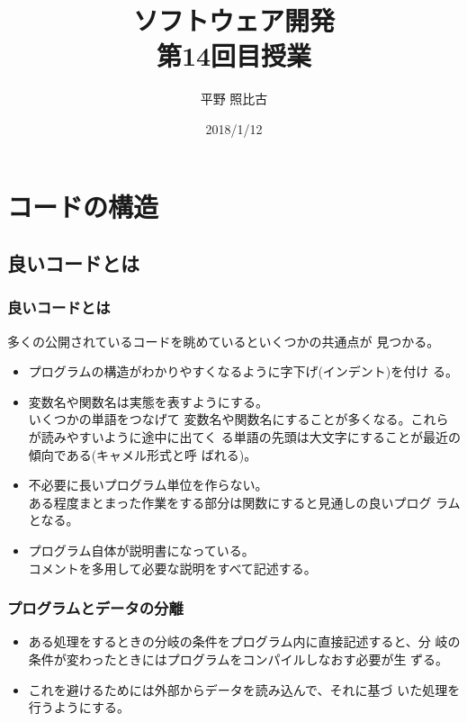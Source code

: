 
\title{ソフトウェア開発\\第14回目授業}
\author{平野 照比古}
\institute{}
\date{2018/1/12}
\newtheorem{Prob}{解説}
\newcommand{\Elm}[1]{\texttt{<#1>}}

\newcommand{\DOMM}{\texttt}
\newcommand{\Event}{\texttt}
\newcommand{\DOMP}{\texttt}
\newcommand{\DOM}{\texttt{DOM}}
\newcommand{\keyitem}{\relax}
\newcommand{\HTML}{HTML文書}

\frame{\maketitle}
\section{コードの構造}
\subsection{良いコードとは}
 \begin{frame}[containsverbatim]
  \frametitle{良いコードとは}
多くの公開されているコードを眺めているといくつかの共通点が
  見つかる。
\begin{itemize}
 \item プログラムの構造がわかりやすくなるように字下げ(インデント)を付け
			 る。
 \item 変数名や関数名は実態を表すようにする。\\いくつかの単語をつなげて
			 変数名や関数名にすることが多くなる。これらが読みやすいように途中に出てく
			 る単語の先頭は大文字にすることが最近の傾向である(キャメル形式と呼
			 ばれる)。
 \item 不必要に長いプログラム単位を作らない。\\
			 ある程度まとまった作業をする部分は関数にすると見通しの良いプログ
			 ラムとなる。
 \item プログラム自体が説明書になっている。\\
			 コメントを多用して必要な説明をすべて記述する。
\end{itemize}
 \end{frame}
 \begin{frame}[containsverbatim]
  \frametitle{プログラムとデータの分離}
  \begin{itemize}
   \item ある処理をするときの分岐の条件をプログラム内に直接記述すると、分
			 岐の条件が変わったときにはプログラムをコンパイルしなおす必要が生
         ずる。
   \item これを避けるためには外部からデータを読み込んで、それに基づ
			 いた処理を行うようにする。

  \end{itemize}
 \end{frame}
